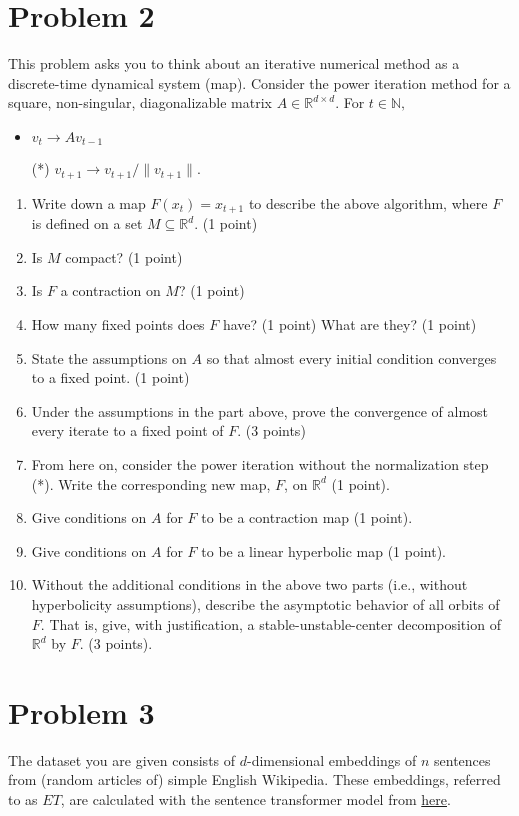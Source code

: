\documentclass[12pt]{article}
\begin{document}
\section*{Problem 2}
This problem asks you to think about an iterative numerical method as a discrete-time dynamical system (map). Consider the power iteration method for a square, non-singular, diagonalizable matrix $A \in \mathbb{R}^{d\times d}.$ For $t \in \mathbb{N},$
\begin{itemize}
	\item $v_t \to Av_{t-1}$
	\item[(*)] $v_{t+1} \to v_{t+1}/\|v_{t+1}\|.$
\end{itemize}
\begin{enumerate}
	\item Write down a map $F(x_t) = x_{t+1}$ to describe the above algorithm, where $F$ is defined on a set $M \subseteq \mathbb{R}^d$. (1 point)
	\item Is $M$ compact? (1 point)
	\item Is $F$ a contraction on $M$? (1 point)
	\item How many fixed points does $F$ have? (1 point) What are they? (1 point)
	\item State the assumptions on $A$ so that almost every initial condition converges to a fixed point. (1 point)
	\item Under the assumptions in the part above, prove the convergence of almost every iterate to a fixed point of $F.$ (3 points)
	\item From here on, consider the power iteration without the normalization step (*). Write the corresponding new map, $F$, on $\mathbb{R}^d$ (1 point).
	\item Give conditions on $A$ for $F$ to be a contraction map (1 point).
	\item Give conditions on $A$ for $F$ to be a linear hyperbolic map (1 point).
	\item Without the additional conditions in the above two parts (i.e., without hyperbolicity assumptions), describe the asymptotic behavior of all orbits of $F.$ That is, give, with justification, a stable-unstable-center decomposition of $\mathbb{R}^d$ by $F.$ (3 points).

\end{enumerate}


\section*{Problem 3}
The dataset you are given consists of $d$-dimensional embeddings of $n$ sentences from (random articles of) simple English Wikipedia.
These embeddings, referred to as $ET$, are calculated with the sentence transformer model from \href{https://huggingface.co/mixedbread-ai/mxbai-embed-large-v1}{here}. 
\end{document}

